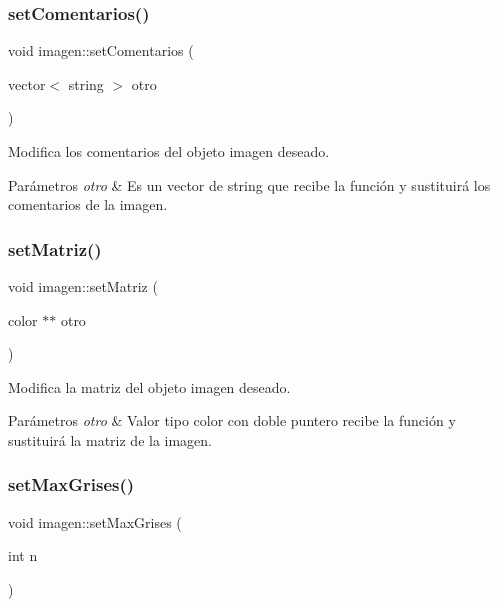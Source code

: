 \subsubsection{\texorpdfstring{set\+Comentarios()}{setComentarios()}}
{\footnotesize\ttfamily void imagen\+::set\+Comentarios (\begin{DoxyParamCaption}\item[{vector$<$ string $>$}]{otro }\end{DoxyParamCaption})}

Modifica los comentarios del objeto imagen deseado. 
\begin{DoxyParams}{Parámetros}
{\em otro} & Es un vector de string que recibe la función y sustituirá los comentarios de la imagen. \\
\hline
\end{DoxyParams}
\mbox{\label{classimagen_afbdd4a238e1e6f6425c37ac1f0facdce}} 
\subsubsection{\texorpdfstring{set\+Matriz()}{setMatriz()}}
{\footnotesize\ttfamily void imagen\+::set\+Matriz (\begin{DoxyParamCaption}\item[{color $\ast$$\ast$}]{otro }\end{DoxyParamCaption})}

Modifica la matriz del objeto imagen deseado. 
\begin{DoxyParams}{Parámetros}
{\em otro} & Valor tipo color con doble puntero recibe la función y sustituirá la matriz de la imagen. \\
\hline
\end{DoxyParams}
\mbox{\label{classimagen_a5503582c1b33a02085a0ffc4eabe9cdc}} 
\subsubsection{\texorpdfstring{set\+Max\+Grises()}{setMaxGrises()}}
{\footnotesize\ttfamily void imagen\+::set\+Max\+Grises (\begin{DoxyParamCaption}\item[{int}]{n }\end{DoxyParamCaption})}

